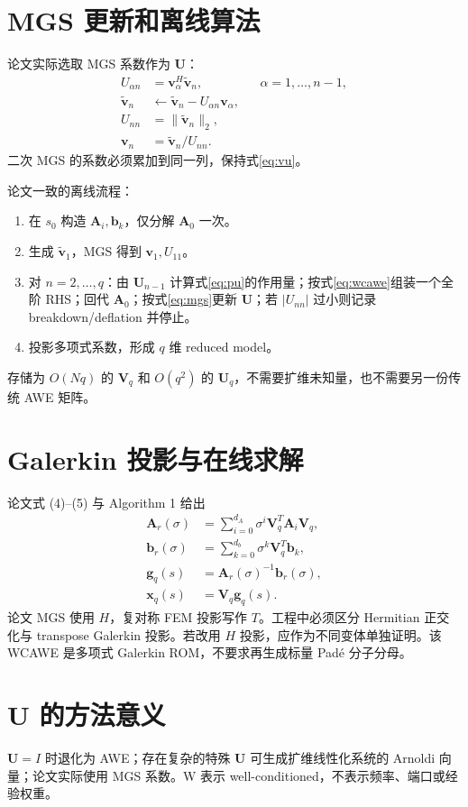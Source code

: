 \documentclass[11pt,a4paper]{ctexart}
\newcommand{\A}{\bm A}
\newcommand{\bvec}{\bm b}
\newcommand{\xvec}{\bm x}
\newcommand{\vvec}{\bm v}
\newcommand{\Umat}{\bm U}
\newcommand{\Vmat}{\bm V}
\begin{document}
\section{MGS 更新和离线算法}
论文实际选取 MGS 系数作为 $\Umat$：
\begin{align}
U_{\alpha n}&=\vvec_\alpha^H\widetilde{\vvec}_n,
&&\alpha=1,\ldots,n-1,\\
\widetilde{\vvec}_n&\leftarrow\widetilde{\vvec}_n-U_{\alpha n}\vvec_\alpha,\\
U_{nn}&=\lVert\widetilde{\vvec}_n\rVert_2,\\
\vvec_n&=\widetilde{\vvec}_n/U_{nn}.
\label{eq:mgs}
\end{align}
二次 MGS 的系数必须累加到同一列，保持式\eqref{eq:vu}。

论文一致的离线流程：
\begin{enumerate}
\item 在 $s_0$ 构造 $\A_i,\bvec_k$，仅分解 $\A_0$ 一次。
\item 生成 $\widetilde{\vvec}_1$，MGS 得到 $\vvec_1,U_{11}$。
\item 对 $n=2,\ldots,q$：由 $\Umat_{n-1}$ 计算式\eqref{eq:pu}的作用量；按式\eqref{eq:wcawe}组装一个全阶 RHS；回代 $\A_0$；按式\eqref{eq:mgs}更新 $\Umat$；若 $|U_{nn}|$ 过小则记录 breakdown/deflation 并停止。
\item 投影多项式系数，形成 $q$ 维 reduced model。
\end{enumerate}
存储为 $O(Nq)$ 的 $\Vmat_q$ 和 $O(q^2)$ 的 $\Umat_q$，不需要扩维未知量，也不需要另一份传统 AWE 矩阵。

\section{Galerkin 投影与在线求解}
论文式 (4)--(5) 与 Algorithm 1 给出
\begin{align}
\A_r(\sigma)&=\sum_{i=0}^{d_A}\sigma^i\Vmat_q^T\A_i\Vmat_q,\\
\bvec_r(\sigma)&=\sum_{k=0}^{d_b}\sigma^k\Vmat_q^T\bvec_k,\\
\bm g_q(s)&=\A_r(\sigma)^{-1}\bvec_r(\sigma),\\
\xvec_q(s)&=\Vmat_q\bm g_q(s).
\end{align}
论文 MGS 使用 $H$，复对称 FEM 投影写作 $T$。工程中必须区分 Hermitian 正交化与 transpose Galerkin 投影。若改用 $H$ 投影，应作为不同变体单独证明。该 WCAWE 是多项式 Galerkin ROM，不要求再生成标量 Pad\'e 分子分母。

\section{\texorpdfstring{$\Umat$}{U} 的方法意义}
$\Umat=I$ 时退化为 AWE；存在复杂的特殊 $\Umat$ 可生成扩维线性化系统的 Arnoldi 向量；论文实际使用 MGS 系数。W 表示 well-conditioned，不表示频率、端口或经验权重。
\end{document}
